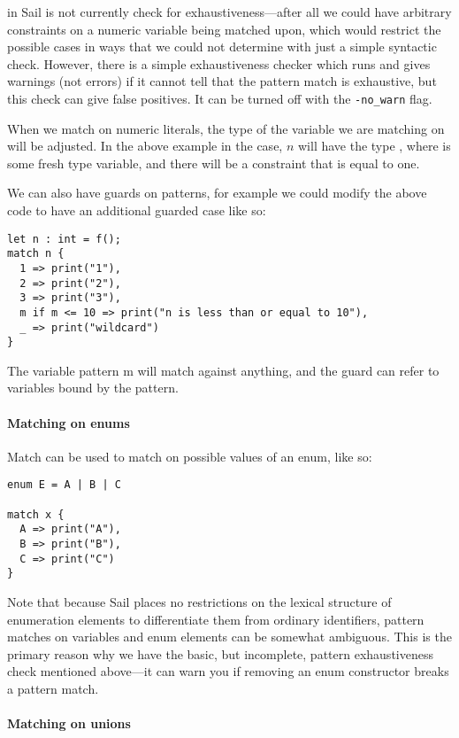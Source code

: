  in Sail is not currently check for exhaustiveness---after
all we could have arbitrary constraints on a numeric variable being
matched upon, which would restrict the possible cases in ways that we
could not determine with just a simple syntactic check. However, there
is a simple exhaustiveness checker which runs and gives warnings (not
errors) if it cannot tell that the pattern match is exhaustive, but
this check can give false positives. It can be turned off with the
\verb+-no_warn+ flag.

When we match on numeric literals, the type of the variable we are
matching on will be adjusted. In the above example in the
 case, $n$ will have the type , where
 is some fresh type variable, and there will be a constraint
that  is equal to one.

We can also have guards on patterns, for example we could modify the
above code to have an additional guarded case like so:
\begin{lstlisting}
let n : int = f();
match n {
  1 => print("1"),
  2 => print("2"),
  3 => print("3"),
  m if m <= 10 => print("n is less than or equal to 10"),
  _ => print("wildcard")
}
\end{lstlisting}
The variable pattern m will match against anything, and the guard can
refer to variables bound by the pattern.

\paragraph{Matching on enums}

Match can be used to match on possible values of an enum, like so:
\begin{lstlisting}
enum E = A | B | C

match x {
  A => print("A"),
  B => print("B"),
  C => print("C")
}
\end{lstlisting}
Note that because Sail places no restrictions on the lexical structure
of enumeration elements to differentiate them from ordinary
identifiers, pattern matches on variables and enum elements can be
somewhat ambiguous. This is the primary reason why we have the basic,
but incomplete, pattern exhaustiveness check mentioned above---it can
warn you if removing an enum constructor breaks a pattern match.

\paragraph{Matching on unions}

